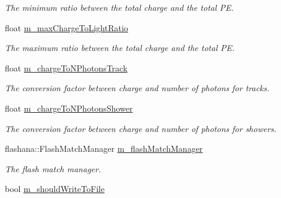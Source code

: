 \begin{DoxyCompactItemize}
\begin{DoxyCompactList}\small\item\em The minimum ratio between the total charge and the total PE. \end{DoxyCompactList}\item 
float \hyperlink{classflashmatch_1_1FlashMatchingTool_a2f5ba137ceabb7e78a992db8f66ff0ad}{m\+\_\+max\+Charge\+To\+Light\+Ratio}\hypertarget{classflashmatch_1_1FlashMatchingTool_a2f5ba137ceabb7e78a992db8f66ff0ad}{}\label{classflashmatch_1_1FlashMatchingTool_a2f5ba137ceabb7e78a992db8f66ff0ad}

\begin{DoxyCompactList}\small\item\em The maximum ratio between the total charge and the total PE. \end{DoxyCompactList}\item 
float \hyperlink{classflashmatch_1_1FlashMatchingTool_a89d4a6c3dae8a3a8aa0db8c0c9a0cb21}{m\+\_\+charge\+To\+N\+Photons\+Track}\hypertarget{classflashmatch_1_1FlashMatchingTool_a89d4a6c3dae8a3a8aa0db8c0c9a0cb21}{}\label{classflashmatch_1_1FlashMatchingTool_a89d4a6c3dae8a3a8aa0db8c0c9a0cb21}

\begin{DoxyCompactList}\small\item\em The conversion factor between charge and number of photons for tracks. \end{DoxyCompactList}\item 
float \hyperlink{classflashmatch_1_1FlashMatchingTool_ab914c01e557cee0b0dd0c461759e7135}{m\+\_\+charge\+To\+N\+Photons\+Shower}\hypertarget{classflashmatch_1_1FlashMatchingTool_ab914c01e557cee0b0dd0c461759e7135}{}\label{classflashmatch_1_1FlashMatchingTool_ab914c01e557cee0b0dd0c461759e7135}

\begin{DoxyCompactList}\small\item\em The conversion factor between charge and number of photons for showers. \end{DoxyCompactList}\item 
flashana\+::\+Flash\+Match\+Manager \hyperlink{classflashmatch_1_1FlashMatchingTool_a11b980eee1a9ecbe15663af51885846d}{m\+\_\+flash\+Match\+Manager}\hypertarget{classflashmatch_1_1FlashMatchingTool_a11b980eee1a9ecbe15663af51885846d}{}\label{classflashmatch_1_1FlashMatchingTool_a11b980eee1a9ecbe15663af51885846d}

\begin{DoxyCompactList}\small\item\em The flash match manager. \end{DoxyCompactList}\item 
bool \hyperlink{classflashmatch_1_1FlashMatchingTool_a4463e9c421fa26d464b037b125e0a11d}{m\+\_\+should\+Write\+To\+File}\hypertarget{classflashmatch_1_1FlashMatchingTool_a4463e9c421fa26d464b037b125e0a11d}{}\label{classflashmatch_1_1FlashMatchingTool_a4463e9c421fa26d464b037b125e0a11d}


\end{DoxyCompactItemize}
